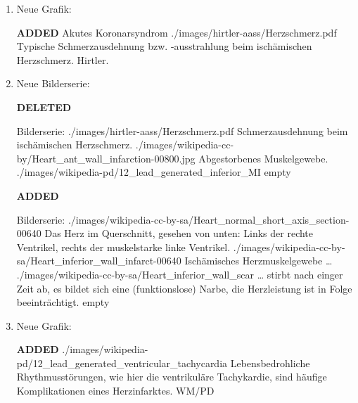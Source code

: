 \documentclass[
ngerman,
paper=a4,
asymmetric,
fontsize=10pt,
headings=small,
draft=false,
numbers=noenddot,
bibtotocnumbered,
footnotes=multiple,
]{scrreprt}
\newcommand{\jALT}{{\color{red}\sffamily\textbf{DELETED}\hrulefill\newline\newline}}
\newcommand{\jALTende}{\newline{\color{red}\rule{\linewidth}{2pt}\newline}}
\newcommand{\jNEU}{{\color{green}\sffamily\textbf{ADDED}\hrulefill\newline\newline}}
\newcommand{\jNEUende}{\newline{\color{green}\rule{\linewidth}{3pt}\newline}}
\begin{document}
\begin{enumerate}
\item Neue Grafik:

\jNEU
{}
{Akutes Koronarsyndrom}
{}
{}
{./images/hirtler-aass/Herzschmerz.pdf}
{Typische Schmerzausdehnung bzw. -ausstrahlung beim ischämischen
Herzschmerz.}
{Hirtler.}
\jNEUende

\item Neue Bilderserie:

\jALT
\begin{PictureSeriesWide}{}{Bilderserie:
}
{./images/hirtler-aass/Herzschmerz.pdf}
{Schmerzausdehnung beim ischämischen
Herzschmerz. }
{./images/wikipedia-cc-by/Heart_ant_wall_infarction-00800.jpg}
{Abgestorbenes Muskelgewebe. }
{./images/wikipedia-pd/12_lead_generated_inferior_MI}
{ }
{empty}
{}
\end{PictureSeriesWide}
\jALTende

\jNEU
\begin{PictureSeriesWide}{}{Bilderserie:
}
{./images/wikipedia-cc-by-sa/Heart_normal_short_axis_section-00640}
{Das Herz im Querschnitt, gesehen von unten: Links der
rechte Ventrikel, rechts der muskelstarke linke Ventrikel.
 }
{./images/wikipedia-cc-by-sa/Heart_inferior_wall_infarct-00640}
{Ischämisches Herzmuskelgewebe {\ldots}
} 
{./images/wikipedia-cc-by-sa/Heart_inferior_wall_scar}
{{\ldots} stirbt nach einger Zeit ab, es bildet sich eine
(funktionslose) Narbe, die Herzleistung ist in Folge beeinträchtigt. 
}
{empty}
{}
\end{PictureSeriesWide}
\jNEUende

\item Neue Grafik:

\jNEU
{}
{}
{}
{}
{./images/wikipedia-pd/12_lead_generated_ventricular_tachycardia}
{Lebensbedrohliche Rhythmusstörungen, wie hier die
ventrikuläre Tachykardie, sind häufige Komplikationen eines
Herzinfarktes.}
{WM/PD}
\jNEUende



\end{enumerate}
\end{document}
